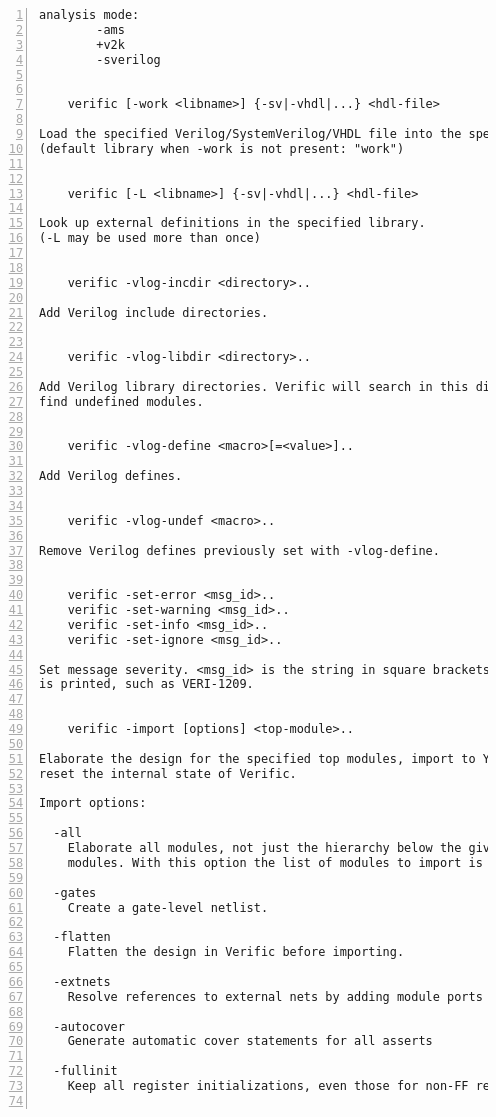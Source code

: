 \begin{lstlisting}[numbers=left,frame=single]
    analysis mode:
        -ams
        +v2k
        -sverilog


    verific [-work <libname>] {-sv|-vhdl|...} <hdl-file>

Load the specified Verilog/SystemVerilog/VHDL file into the specified library.
(default library when -work is not present: "work")


    verific [-L <libname>] {-sv|-vhdl|...} <hdl-file>

Look up external definitions in the specified library.
(-L may be used more than once)


    verific -vlog-incdir <directory>..

Add Verilog include directories.


    verific -vlog-libdir <directory>..

Add Verilog library directories. Verific will search in this directories to
find undefined modules.


    verific -vlog-define <macro>[=<value>]..

Add Verilog defines.


    verific -vlog-undef <macro>..

Remove Verilog defines previously set with -vlog-define.


    verific -set-error <msg_id>..
    verific -set-warning <msg_id>..
    verific -set-info <msg_id>..
    verific -set-ignore <msg_id>..

Set message severity. <msg_id> is the string in square brackets when a message
is printed, such as VERI-1209.


    verific -import [options] <top-module>..

Elaborate the design for the specified top modules, import to Yosys and
reset the internal state of Verific.

Import options:

  -all
    Elaborate all modules, not just the hierarchy below the given top
    modules. With this option the list of modules to import is optional.

  -gates
    Create a gate-level netlist.

  -flatten
    Flatten the design in Verific before importing.

  -extnets
    Resolve references to external nets by adding module ports as needed.

  -autocover
    Generate automatic cover statements for all asserts

  -fullinit
    Keep all register initializations, even those for non-FF registers.


\end{lstlisting}
